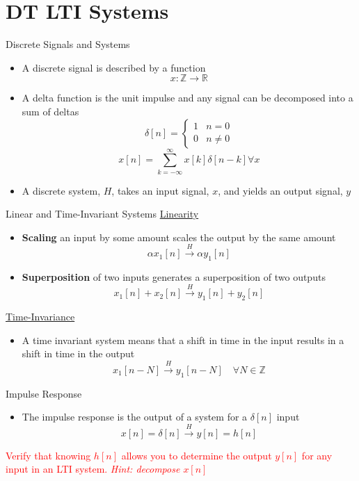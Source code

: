 \section{DT LTI Systems}

\begin{frame}{Discrete Signals and Systems}

    \begin{itemize}
        \item A discrete signal is described by a function
            \[
                x: \mathbb{Z} \rightarrow \mathbb{R}
            \]
        \item A delta function is the unit impulse and any signal can be decomposed into a sum of deltas
            \[
                \delta[n] = 
                \begin{cases}
                    1 & n= 0 \\
                    0 & n\ne 0
                \end{cases}
            \]
            \[
                x[n] = \sum_{k=-\infty}^{\infty} x[k]\delta[n-k] \forall x
            \]
        \item A discrete system, $H$, takes an input signal, $x$, and yields an output signal, $y$
    \end{itemize}
\end{frame}

\begin{frame}{Linear and Time-Invariant Systems}
    \underline{Linearity}
    \begin{itemize}
        \item \textbf{Scaling} an input by some amount scales the output by the same amount
        \[\alpha x_1[n] \overset{H}{\longrightarrow} \alpha y_1[n]\]
        \item \textbf{Superposition} of two inputs generates a superposition of two outputs
        \[x_1[n] + x_2[n] \overset{H}{\longrightarrow} y_1[n] + y_2[n]\]
    \end{itemize}
    \underline{Time-Invariance}
    \begin{itemize}
        \item A time invariant system means that a shift in time in the input results in a shift in time in the output
        \[
        x_1[n-N] \overset{H}{\longrightarrow} y_1[n-N]\quad \forall N \in \mathbb{Z}
        \]
    \end{itemize}
\end{frame}

\begin{frame}{Impulse Response}
\begin{itemize}
    \item The impulse response is the output of a system for a $\delta[n]$ input
    \[
        x[n] = \delta[n] \overset{H}{\longrightarrow} y[n] = h[n]
    \]
\end{itemize}

\vspace{30px}

\textcolor{red}{Verify that knowing $h[n]$ allows you to determine the output $y[n]$ for any input in an LTI system. \textit{Hint: decompose $x[n]$}}
    
\end{frame}

